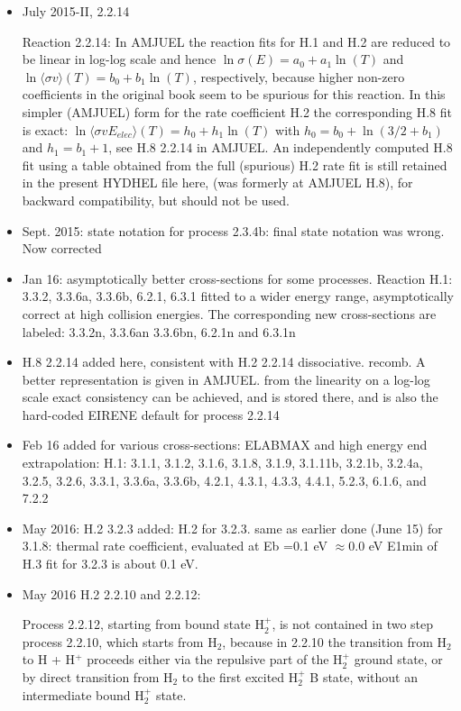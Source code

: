 \documentclass[12pt,dvipdfmx]{article}
\begin{document}
\begin{itemize}
\item{July 2015-II,  2.2.14}

Reaction 2.2.14: In AMJUEL the reaction fits for H.1 and H.2 are reduced to be linear in log-log scale and hence $\ln \sigma(E) = a_0 + a_1 \ln(T)$ and $\ln \langle\sigma v\rangle(T) = b_0 + b_1 \ln(T)$, respectively,
because higher non-zero coefficients
in the original book \cite{kn:Janev87} seem to be spurious for this reaction.
In this simpler (AMJUEL) form for the rate coefficient H.2 the corresponding H.8 fit
is exact: $\ln \langle\sigma v E_{elec}\rangle(T) = h_0 +h_1 \ln(T)$ with $h_0 = b_0+\ln(3/2+b_1)$ and $h_1=b_1+1$, see H.8  2.2.14 in AMJUEL.
An independently computed H.8 fit using a table obtained from the full (spurious) H.2 rate fit is still retained in the present HYDHEL file here, (was formerly at AMJUEL H.8),
for backward compatibility, but should not be used.

\item{Sept. 2015: state notation for process 2.3.4b: final state notation was wrong.}
Now corrected

\item{Jan 16: asymptotically better cross-sections for some processes.}
Reaction H.1:  3.3.2,  3.3.6a,  3.3.6b, 6.2.1,  6.3.1  fitted to a wider energy range, asymptotically correct
at high collision energies.
The corresponding new cross-sections are labeled: 3.3.2n, 3.3.6an 3.3.6bn, 6.2.1n and 6.3.1n

\item{H.8  2.2.14 added here, consistent with H.2 2.2.14 dissociative. recomb.}
A better representation is given in AMJUEL. from the linearity on a log-log scale exact consistency
can be achieved, and is stored there, and is also the hard-coded EIRENE default for process 2.2.14

\item{Feb 16 added for various cross-sections: ELABMAX and high energy end extrapolation:
H.1:  3.1.1, 3.1.2, 3.1.6, 3.1.8, 3.1.9, 3.1.11b, 3.2.1b, 3.2.4a, 3.2.5, 3.2.6, 3.3.1, 3.3.6a, 3.3.6b,
4.2.1, 4.3.1, 4.3.3,  4.4.1, 5.2.3, 6.1.6, and 7.2.2}

\item{May 2016: H.2  3.2.3}
added: H.2 for 3.2.3. same as earlier done (June 15) for 3.1.8: thermal rate coefficient, evaluated at Eb =0.1 eV $\approx 0.0$ eV
E1min of H.3 fit for 3.2.3 is about 0.1 eV.

\item{May 2016 H.2 2.2.10 and 2.2.12:}

Process 2.2.12, starting from bound state H$_2^+$, is not contained in two step process 2.2.10,
which starts from H$_2$,
because in 2.2.10 the transition from H$_2$ to H + H$^+$ proceeds either via the repulsive part
of the H$_2^+$ ground state,
or by direct transition from H$_2$ to the first excited H$_2^+$  B state, without an intermediate bound H$_2^+$ state.
\end{itemize}
\end{document}

